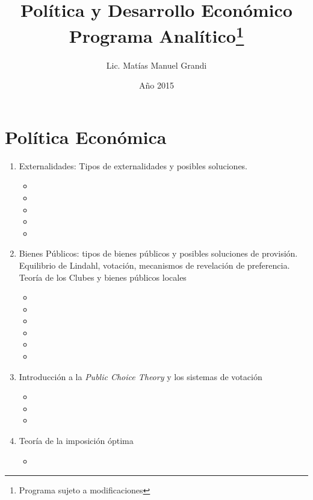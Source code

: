 \documentclass[10pt,a4paper]{article}
\title{Política y Desarrollo Económico \\ Programa Analítico\footnote{Programa sujeto a modificaciones}}
\date{Año 2015}
\author{Lic. Matías Manuel Grandi}
\begin{document}
\maketitle
\section{Política Económica}
\begin{enumerate}
	\item Externalidades: Tipos de externalidades y posibles soluciones.
 	\begin{itemize}
 		\item {}
		\item {}
		\item {}
		\item {}
		\item {}
	\end{itemize}

	\item Bienes Públicos: tipos de bienes públicos y posibles soluciones de provisión. Equilibrio de Lindahl, votación, mecanismos de revelación de preferencia. Teoría de los Clubes y bienes públicos locales 
 	\begin{itemize}
		\item {}
		\item {}
		\item {}
		\item {}
		\item {}
		\item {}
	\end{itemize}

	\item Introducción a la \textit{Public Choice Theory} y los sistemas de votación
 	\begin{itemize}
 		\item {}
		\item {}
		\item {}
	\end{itemize}
	
	\item Teoría de la imposición óptima
	\begin{itemize}
		\item {}
	\end{itemize}	


\end{enumerate}
\end{document}

